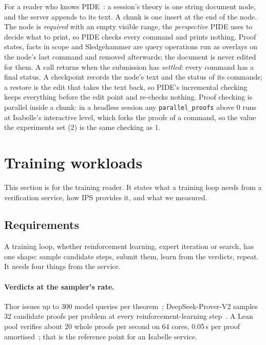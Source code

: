 \documentclass[11pt]{article}
\newcommand{\code}[1]{\colorbox{gray!12}{\texttt{\vphantom{Ag}#1}}}
\begin{document}
For a reader who knows PIDE~\cite{wenzel2014pide}: a session's theory is
one string document node, and the server appends to its text. A chunk is
one insert at the end of the node. The node is \emph{required} with an
empty visible range, the \emph{perspective} PIDE uses to decide what to
print, so PIDE checks every command and prints nothing. Proof states,
facts in scope and Sledgehammer are query operations run as overlays on
the node's last command and removed afterwards; the document is never
edited for them. A call returns when the submission has \emph{settled}:
every command has a final status. A checkpoint records the node's text
and the status of its commands; a restore is the edit that takes the text
back, so PIDE's incremental checking keeps everything before the edit
point and re-checks nothing. Proof checking is parallel inside a chunk: in
a headless session any \code{parallel\_proofs} above 0 runs at Isabelle's
interactive level, which forks the proofs of a command, so the value the
experiments set (2) is the same checking as 1.

\section{Training workloads}
\label{sec:training}

This section is for the training reader. It states what a training loop
needs from a verification service, how IPS provides it, and what we
measured.

\subsection{Requirements}
\label{sec:training-req}

A training loop, whether reinforcement learning, expert iteration or
search, has one shape: sample candidate steps, submit them, learn from
the verdicts, repeat. It needs four things from the service.

\paragraph{Verdicts at the sampler's rate.} Thor issues up to 300 model
queries per theorem~\cite{jiang2022thor}; DeepSeek-Prover-V2 samples 32
candidate proofs per problem at every reinforcement-learning
step~\cite{deepseek2025proverv2}. A Lean pool verifies about 20 whole
proofs per second on 64 cores, 0.05\,s per proof
amortised~\cite{santos2025kimina}; that is the reference point for an
Isabelle service.
\end{document}
